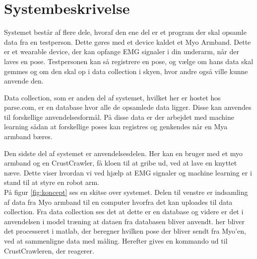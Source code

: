 \thispagestyle{fancy}
\chapter{Systembeskrivelse}
\label{chp:systembeskrivelse}

Systemet består af flere dele, hvoraf den ene del er et program der skal opsamle data fra en testperson. Dette gøres med et device kaldet et Myo Armband. Dette er et wearable device, der kan opfange EMG signaler i din underarm, når der laves en pose. Testpersonen kan så registrere en pose, og vælge om hans data skal gemmes og om den skal op i data collection i skyen, hvor andre også ville kunne anvende den.

Data collection, som er anden del af systemet, hvilket her er hostet hos parse.com, er en database hvor alle de opsamlede data ligger. Disse kan anvendes til forskellige anvendelsesformål. På disse data er der arbejdet med machine learning sådan at forskellige poses kan registres og genkendes  når en Mya armband bæres.

Den sidste del af systemet er anvendelsesdelen. Her kan en bruger med et myo armband og en CrustCrawler, få kloen til at gribe ud, ved at lave en knyttet næve. Dette viser hvordan vi ved hjælp at EMG signaler og machine learning er i stand til at styre en robot arm.\\
På figur \ref{fig:koncept} ses en skitse over systemet. Delen til venstre er indsamling af data fra Myo armband til en computer hvorfra det kan uploades til data collection. Fra data collection ses det at dette er en database og videre er det i anvendelsen i model træning at dataen fra databasen bliver anvendt. her bliver det processeret i matlab, der beregner hvilken pose der bliver sendt fra Myo'en, ved at sammenligne data med måling. Herefter gives en kommando ud til CrustCrawleren, der reagerer.

